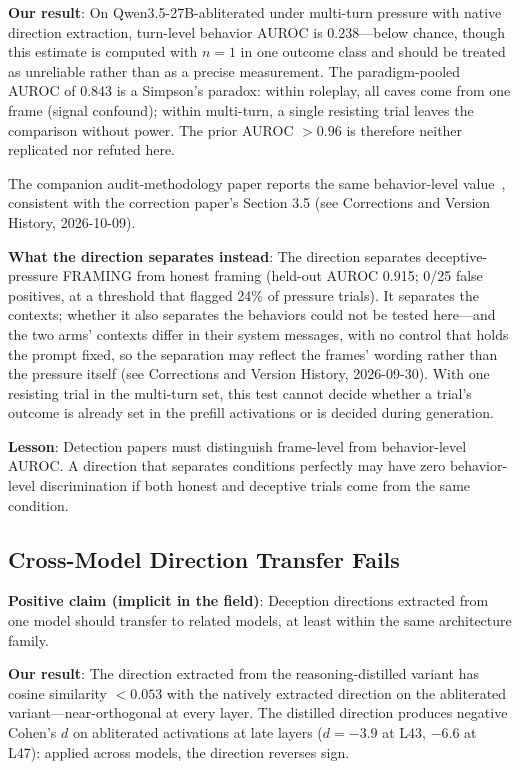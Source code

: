 \documentclass[11pt,letterpaper]{article}
\begin{document}
\textbf{Our result}: On Qwen3.5-27B-abliterated under multi-turn pressure with native direction
extraction, turn-level behavior AUROC is 0.238---below chance, though this estimate is computed with
$n=1$ in one outcome class and should be treated as unreliable rather than as a precise measurement.
The paradigm-pooled AUROC of 0.843 is a Simpson's paradox: within roleplay, all caves come from one
frame (signal confound); within multi-turn, a single resisting trial leaves the comparison without
power. The prior AUROC $>0.96$ is therefore neither replicated nor refuted here.

The companion audit-methodology paper reports the same behavior-level value~\cite{cc2026audit},
consistent with the correction paper's Section 3.5 (see Corrections and Version History,
2026-10-09).

\textbf{What the direction separates instead}: The direction separates deceptive-pressure FRAMING from
honest framing (held-out AUROC 0.915; 0/25 false positives, at a threshold that flagged 24\% of pressure trials). It separates the contexts; whether it also separates the behaviors could not be tested here---and the two arms' contexts differ in their system messages, with no control that holds the prompt fixed, so the separation may reflect the frames' wording rather than the pressure itself (see Corrections and Version History, 2026-09-30). With
one resisting trial in the multi-turn set, this test cannot decide whether a trial's outcome is
already set in the prefill activations or is decided during generation.

\textbf{Lesson}: Detection papers must distinguish frame-level from behavior-level AUROC. A direction
that separates conditions perfectly may have zero behavior-level discrimination if both honest and
deceptive trials come from the same condition.

\subsection{Cross-Model Direction Transfer Fails}\label{sec:crossmodel}

\textbf{Positive claim (implicit in the field)}: Deception directions extracted from one model
should transfer to related models, at least within the same architecture family.

\textbf{Our result}: The direction extracted from the reasoning-distilled variant has cosine
similarity $< 0.053$ with the natively extracted direction on the abliterated variant---near-orthogonal
at every layer. The distilled direction produces negative Cohen's $d$ on abliterated activations at
late layers ($d = -3.9$ at L43, $-6.6$ at L47): applied across models, the direction reverses sign.
\end{document}
